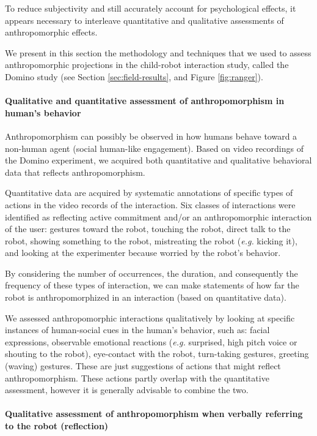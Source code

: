 \documentclass{frontiersSCNS} %
\newcommand{\eg}{\textit{e.g.}\xspace}
\begin{document}
To reduce subjectivity and still accurately account for psychological effects,
it appears necessary to interleave quantitative and qualitative assessments of
anthropomorphic effects.

We present in this section the methodology and techniques that we used to assess
anthropomorphic projections in the child-robot interaction study, called the
Domino study (see Section \ref{sec:field-results}, and Figure \ref{fig:ranger}).

\paragraph{Qualitative and quantitative assessment of anthropomorphism in
human's behavior\\}

Anthropomorphism can possibly be observed in how humans behave toward a
non-human agent (social human-like engagement). Based on video recordings of the
Domino experiment, we acquired both quantitative and qualitative behavioral data
that reflects anthropomorphism.

Quantitative data are acquired by systematic annotations of specific types of
actions in the video records of the interaction. Six classes of interactions
were identified as reflecting active commitment and/or an anthropomorphic
interaction of the user: gestures toward the robot, touching the robot, direct
talk to the robot, showing something to the robot, mistreating the robot (\eg
kicking it), and looking at the experimenter because worried by the robot's
behavior.

By considering the number of occurrences, the duration, and consequently the
frequency of these types of interaction, we can make statements of how far the
robot is anthropomorphized in an interaction (based on quantitative data).

We assessed anthropomorphic interactions qualitatively by looking at specific
instances of human-social cues in the human's behavior, such as: facial
expressions, observable emotional reactions (\eg surprised, high pitch voice or
shouting to the robot), eye-contact with the robot, turn-taking gestures,
greeting (waving) gestures. These are just suggestions of actions that might
reflect anthropomorphism. These actions partly overlap with the quantitative
assessment, however it is generally advisable to combine the two.


\paragraph{Qualitative assessment of anthropomorphism when verbally referring to
the robot (reflection)\\}
\end{document}
